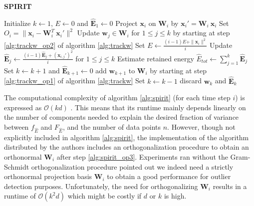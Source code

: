 \vspace{-0.2cm}
\begin{algorithm}[H]
	\vspace{-0.02cm}
	\caption{\quad \textbf{SPIRIT}}
	\label{alg:spirit}
	\vspace{-0.03cm}
	\begin{algorithmic}[1]
		\vspace{-0.025cm}
		\STATE Initialize $k \gets 1$, $E \gets 0$ and $\hat{\mathbf{E}}_1 \gets 0$
		\STATE Project $\mathbf{x}_i$ on $\mathbf{W}_i$ by $\mathbf{x}_i' = \mathbf{W}_i \ \mathbf{x}_i$
		\STATE	Set $O_i = \|\mathbf{x}_i - \mathbf{W}_i^T \ \mathbf{x}_i'\|^2$
		\label{alg:spirit_op4}	
		\STATE Update $\mathbf{w}_j \in \mathbf{W}_i$ for $1 \leq j \leq k$ by starting at step \ref{alg:trackw_op2} of algorithm \ref{alg:trackw} 
		\label{alg:spirit_op3}
		\STATE Set $E \gets \frac{(i - 1)E + \|\mathbf{x}_i\|^2}{i}$
		\label{alg:spirit_op5}
		\STATE Update $\hat{\mathbf{E}}_j \gets \frac{(i - 1)\hat{\mathbf{E}}_j + (\mathbf{x}_{i,j}')^2}{i}$ for $1 \leq j \leq k$
		\label{alg:spirit_op6}
		\STATE Estimate retained energy $\hat{E}_{tot} \gets \sum\limits_{j=1}^{k}\hat{\mathbf{E}}_j$
		\label{alg:spirit_op7}
		\label{alg:spirit_op8}
		\STATE Set $k \gets k + 1$ and $\hat{\mathbf{E}}_{k+1} \gets 0 $
		\label{alg:spirit_op9}
		\STATE add $\mathbf{w}_{k+1}$ to $\mathbf{W}_i$ by starting at step \ref{alg:trackw_op1} of algorithm \ref{alg:trackw}
		\label{alg:spirit_op10}
		\label{alg:spirit_op11}
		\STATE Set $k \gets k - 1$
		\label{alg:spirit_op12}
		\STATE discard $\mathbf{w}_k$ and $\hat{\mathbf{E}}_k$
		\label{alg:spirit_op13}
		\ENDIF
		\ENDFOR
	\vspace{-0.02cm}	
	\end{algorithmic}
\vspace{-0.1cm}
\end{algorithm}

\vspace{-0.1cm}
The computational complexity of algorithm \ref{alg:spirit} (for each time step $i$) is expressed as $\mathcal{O}(kd)$ \cite{papadimitriou2005streaming}. This means that its runtime mainly depends linearly on the number of components needed to explain the desired fraction of variance between $f_{\hat{E}}$ and $F_{\hat{E}}$, and the number of data points $n$. 
However, though not explicitly included in algorithm \ref{alg:spirit}, the implementation of the algorithm distributed by the authors includes an orthogonalization procedure to obtain an orthonormal $\mathbf{W}_i$ after step \ref{alg:spirit_op3}. Experiments ran without the Gram-Schmidt orthogonalization procedure pointed out we indeed need a strictly orthonormal projection basis $\mathbf{W}_i$ to obtain a good performance for outlier detection purposes. Unfortunately, the need for orthogonalizing $\mathbf{W}_i$ results in a runtime of $\mathcal{O}(k^2d)$ which might be costly if $d$ or $k$ is high. 

